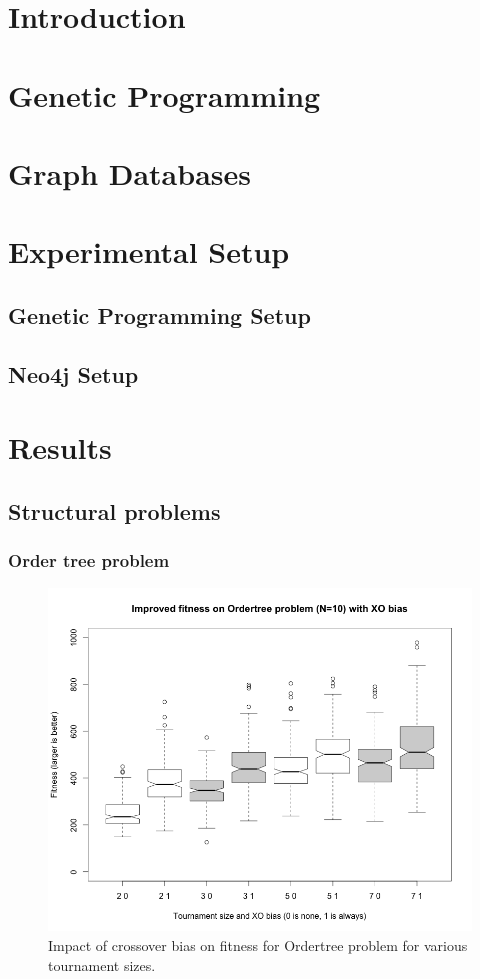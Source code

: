 \documentclass{sig-alternate}
\begin{document}
\category{}{}{}
\terms{}

\section{Introduction} \label{Introduction}

\section{Genetic Programming} \label{Genetic Programming}

\section{Graph Databases} \label{Graph Databases}

\section{Experimental Setup} \label{Experiments}

\subsection{Genetic Programming Setup} \label{Genetic Programming Setup}

\subsection{Neo4j Setup} \label{Neo4j Setup}

\section{Results} \label{Results}

\subsection{Structural problems}

\subsubsection{Order tree problem}

\begin{figure}
\centering
\includegraphics[width=0.45 \textwidth]{Plots/Ordertree_results.png}
\caption{Impact of crossover bias on fitness for Ordertree problem for various tournament sizes.}
\label{fig:Ordertree_results}
\end{figure}
\end{document}
